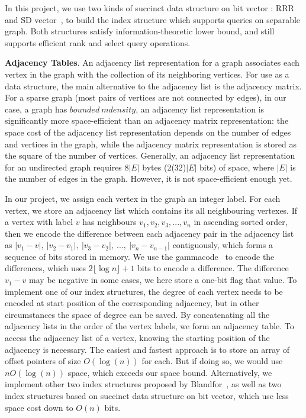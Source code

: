 \documentclass[12pt,glossary]{dalthesis}
\begin{document}
In this project, we use two kinds of succinct data structure on bit vector : RRR~\cite{RRR} and SD vector~\cite{SD-vector}, to build the index structure which supports queries on separable graph. Both structures satisfy information-theoretic lower bound, and still supports efficient rank and select query operations.

\textbf{Adjacency Tables}. An adjacency list representation for a graph associates each vertex in the graph with the collection of its neighboring vertices. For use as a data structure, the main alternative to the adjacency list is the adjacency matrix. For a sparse graph (most pairs of vertices are not connected by edges), in our case, a graph has $bounded \ mdensity$, an adjacency list representation is significantly more space-efficient than an adjacency matrix representation: the space cost of the adjacency list representation depends on the number of edges and vertices in the graph, while the adjacency matrix representation is stored as the square of the number of vertices. Generally, an adjacency list representation for an undirected graph requires 8$|E|$ bytes (2(32)$|E|$ bits) of space, where $|E|$ is the number of edges in the graph. However, it is not space-efficient enough yet.

In our project, we assign each vertex in the graph an integer label. For each vertex, we store an adjacency list which contains its all neighbouring vertexes. If a vertex with label $v$ has neighbours $v_{1}, v_{2}, v_{3}, ...,v_{n}$ in ascending sorted order, then we encode the difference between each adjacency pair in the adjacency list as $|v_{1}-v|, \ |v_{2}-v_{1}|,\  |v_{3}-v_{2}|,\ ...,\ |v_{n}-v_{n-1}|$ contiguously, which forms a sequence of bits stored in memory. We use the gammacode~\cite{Gamma} to encode the differences, which uses $2\lfloor \log n \rfloor + 1$ bits to encode a difference. The difference $v_{1} - v$ may be negative in some cases, we here store a one-bit flag that value. To implement one of our index structures, the degree of each vertex needs to be encoded at start position of the corresponding adjacency, but in other circumstances the space of degree can be saved. By concatenating all the adjacency lists in the order of the vertex labels, we form an adjacency table. To access the adjacency list of a vertex, knowing the starting position of the adjacency
is necessary. The easiest and fastest approach is to store an array of offset pointers of size $O(\log (n))$ for each. But if doing so, we would use $nO(\log (n))$ space, which exceeds our space bound. Alternatively, we implement other two index structures proposed by Blandfor~\cite{compact-representation}, as well as two index structures based on succinct data structure on bit vector, which use less space cost down to $O(n)$ bits.
\end{document}
